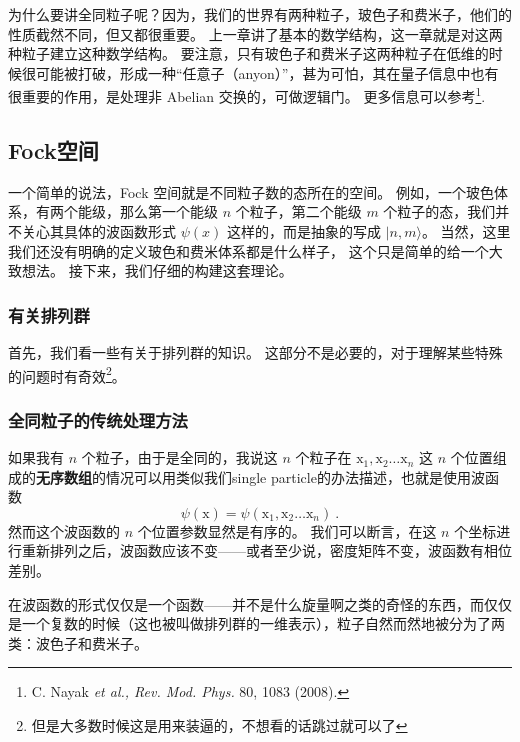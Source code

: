 
为什么要讲全同粒子呢？因为，我们的世界有两种粒子，玻色子和费米子，他们的性质截然不同，但又都很重要。 上一章讲了基本的数学结构，这一章就是对这两种粒子建立这种数学结构。 要注意，只有玻色子和费米子这两种粒子在低维的时候很可能被打破，形成一种“任意子（anyon）”，甚为可怕，其在量子信息中也有很重要的作用，是处理非 Abelian 交换的，可做逻辑门。 更多信息可以参考\footnote{C. Nayak \textsl{et al., Rev. Mod. Phys.} 80, 1083 (2008).}.

\subsection{Fock空间}

一个简单的说法，Fock 空间就是不同粒子数的态所在的空间。 例如，一个玻色体系，有两个能级，那么第一个能级 $n$ 个粒子，第二个能级 $m$ 个粒子的态，我们并不关心其具体的波函数形式 $\psi(x)$ 这样的，而是抽象的写成 $|n,m\rangle$。 当然，这里我们还没有明确的定义玻色和费米体系都是什么样子， 这个只是简单的给一个大致想法。 接下来，我们仔细的构建这套理论。

\subsubsection{有关排列群}

首先，我们看一些有关于排列群的知识。 这部分不是必要的，对于理解某些特殊的问题时有奇效\footnote{但是大多数时候这是用来装逼的，不想看的话跳过就可以了}。

\subsubsection{全同粒子的传统处理方法}

如果我有 $n$ 个粒子，由于是全同的，我说这 $n$ 个粒子在 ${\mathrm x}_1, {\mathrm x}_2 \dots {\mathrm x}_n$ 这 $n$ 个位置组成的\textbf{无序数组}的情况可以用类似我们single particle的办法描述，也就是使用波函数
\begin{equation}
\psi({\mathrm x}) = \psi({\mathrm x}_1, {\mathrm x}_2\dots {\mathrm x}_n)~.
\end{equation}
然而这个波函数的 $n$ 个位置参数显然是有序的。 我们可以断言，在这 $n$ 个坐标进行重新排列之后，波函数应该不变——或者至少说，密度矩阵不变，波函数有相位差别。

在波函数的形式仅仅是一个函数——并不是什么旋量啊之类的奇怪的东西，而仅仅是一个复数的时候（这也被叫做排列群的一维表示），粒子自然而然地被分为了两类：波色子和费米子。

